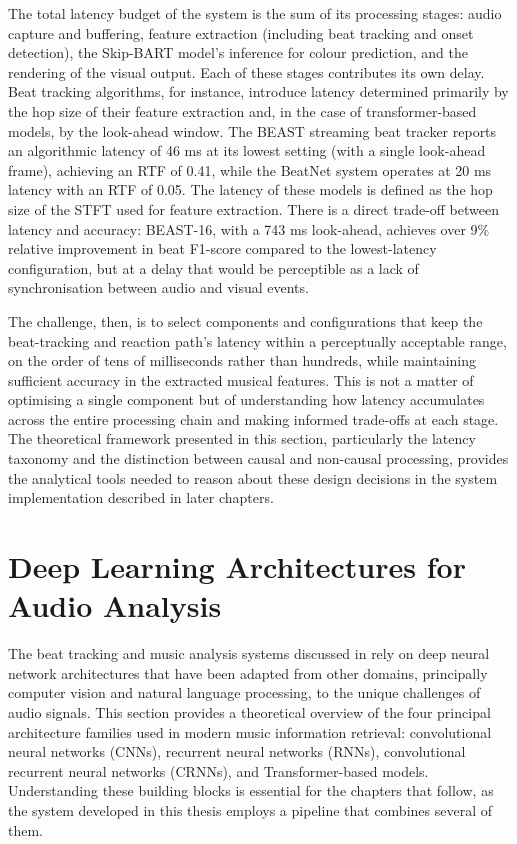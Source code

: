The total latency budget of the system is the sum of its processing stages: audio capture and buffering, feature extraction (including beat tracking and onset detection), the Skip-BART model's inference for colour prediction, and the rendering of the visual output. Each of these stages contributes its own delay. Beat tracking algorithms, for instance, introduce latency determined primarily by the hop size of their feature extraction and, in the case of transformer-based models, by the look-ahead window. The BEAST streaming beat tracker reports an algorithmic latency of 46 ms at its lowest setting (with a single look-ahead frame), achieving an RTF of 0.41, while the BeatNet system operates at 20 ms latency with an RTF of 0.05.\cite{chang2024beast}  The latency of these models is defined as the hop size of the STFT used for feature extraction. There is a direct trade-off between latency and accuracy: BEAST-16, with a 743 ms look-ahead, achieves over 9\% relative improvement in beat F1-score compared to the lowest-latency configuration,\cite{chang2024beast}  but at a delay that would be perceptible as a lack of synchronisation between audio and visual events.

The challenge, then, is to select components and configurations that keep the beat-tracking and reaction path's latency within a perceptually acceptable range, on the order of tens of milliseconds rather than hundreds, while maintaining sufficient accuracy in the extracted musical features. This is not a matter of optimising a single component but of understanding how latency accumulates across the entire processing chain and making informed trade-offs at each stage. The theoretical framework presented in this section, particularly the latency taxonomy and the distinction between causal and non-causal processing, provides the analytical tools needed to reason about these design decisions in the system implementation described in later chapters.

\section{Deep Learning Architectures for Audio Analysis}
\label{sec:ch2-deep-learning}

The beat tracking and music analysis systems discussed in  rely on deep neural network architectures that have been adapted from other domains, principally computer vision and natural language processing, to the unique challenges of audio signals. This section provides a theoretical overview of the four principal architecture families used in modern music information retrieval: convolutional neural networks (CNNs), recurrent neural networks (RNNs), convolutional recurrent neural networks (CRNNs), and Transformer-based models. Understanding these building blocks is essential for the chapters that follow, as the system developed in this thesis employs a pipeline that combines several of them.

